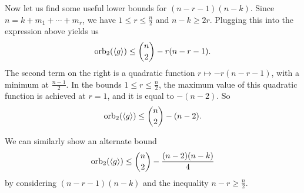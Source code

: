 Now let us find some useful lower bounds for $(n-r-1)(n-k)$.
Since $n = k + m_1 + \cdots + m_r$, we have $1 \le r \le \frac{n}{2}$ and $n-k
\ge 2r$.
Plugging this into the expression above yields us
\[
  \operatorname{orb}_2(\left< g \right>)
  \le \binom{n}{2} - r(n - r - 1).
\]
The second term on the right is a quadratic function $r \mapsto -r(n-r-1)$,
with a minimum at $\frac{n-1}{2}$.
In the bounds $1 \le r \le \frac{n}{2}$, the maximum value of this quadratic
function is achieved at $r = 1$, and it is equal to $-(n-2)$.
So
\[
  \operatorname{orb}_2(\left< g \right>)
  \le \binom{n}{2} - (n-2).
\]

We can similarly show an alternate bound
\[
  \operatorname{orb}_2(\left< g \right>)
  \le \binom{n}{2} - \frac{(n-2)(n-k)}{4}
\]
by considering $(n-r-1)(n-k)$ and the inequality $n-r \ge \frac{n}{2}$.

